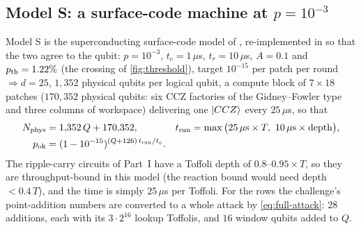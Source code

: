 \subsection{Model S: a surface-code machine at $p=10^{-3}$}\label{sec:modelS}
Model S is the superconducting surface-code model of , re-implemented in  so that the two agree to the qubit: $p=10^{-3}$, $t_c=1\,\mu$s, $t_r=10\,\mu$s, $A=0.1$ and $p_{\rm th}=1.22\%$ (the crossing of \cref{fig:threshold}), target $10^{-15}$ per patch per round $\Rightarrow d=25$, $1{,}352$ physical qubits per logical qubit, a compute block of $7\times18$ patches ($170{,}352$ physical qubits: six CCZ factories of the Gidney--Fowler type and three columns of workspace) delivering one $\lvert CCZ \rangle$ every $25\,\mu$s, so that
\begin{equation}\label{eq:modelS}
\begin{aligned}
N_{\rm phys}&=1{,}352\,Q+170{,}352, & t_{\rm run}&=\max\big(25\,\mu\mathrm{s}\times T,\ 10\,\mu\mathrm{s}\times\text{depth}\big),\\
p_{\rm ok}&=(1-10^{-15})^{(Q+126)\,t_{\rm run}/t_c}.
\end{aligned}
\end{equation}
The ripple-carry circuits of Part~I have a Toffoli depth of $0.8$--$0.95\times T$, so they are throughput-bound in this model (the reaction bound would need depth $<0.4\,T$), and the time is simply $25\,\mu$s per Toffoli. For the \ecdsafail{} rows the challenge's point-addition numbers are converted to a whole attack by \cref{eq:full-attack}: $28$ additions, each with its $3\cdot2^{16}$ lookup Toffolis, and $16$ window qubits added to $Q$.

\begin{table}[H]
\centering\scriptsize
\setlength{\tabcolsep}{3.5pt}

\caption{Model S applied to the \ecdsafail{} circuits, to the published logical costs, and to the  circuits (computed, ; the logical inputs of each row are cited in \cref{tab:external} and \cref{sec:shor-impl}). ``expected'' divides the run time by $p_{\rm ok}$ (and multiplies by the expected number of shots where a source specifies more than one). The RSA-2048 row feeds Gidney's logical inputs through the same model; his published figure---under a million qubits, under a week---uses yoked storage for idle qubits and cultivation, which this model does not, so the row shows the model's conservatism rather than a discrepancy.}
\label{tab:modelS}
\end{table}

